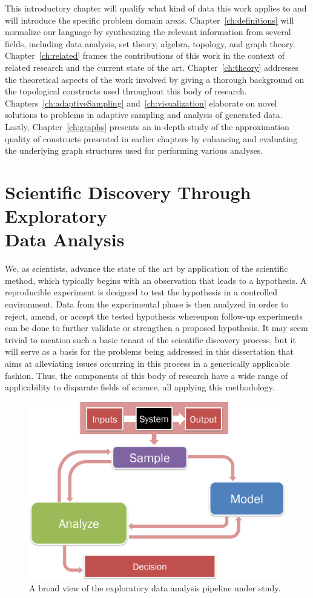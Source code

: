 This introductory chapter will qualify what kind of data this work applies to and will introduce the specific problem domain areas.
%
Chapter~\ref{ch:definitions} will normalize our language by synthesizing the relevant information from several fields, including data analysis, set theory, algebra, topology, and graph theory.
%
Chapter~\ref{ch:related} frames the contributions of this work in the context of related research and the current state of the art.
%
Chapter~\ref{ch:theory} addresses the theoretical aspects of the work involved by giving a thorough background on the topological constructs used throughout this body of research.
%
Chapters~\ref{ch:adaptiveSampling} and~\ref{ch:visualization} elaborate on novel solutions to problems in adaptive sampling and analysis of generated data.
%
Lastly, Chapter~\ref{ch:graphs} presents an in-depth study of the approximation quality of constructs presented in earlier chapters by enhancing and evaluating the underlying graph structures used for performing various analyses.

\section{Scientific Discovery Through Exploratory\\Data Analysis}

We, as scientists, advance the state of the art by application of the scientific method, which typically begins with an observation that leads to a hypothesis.
%
A reproducible experiment is designed to test the hypothesis in a controlled environment.
%
Data from the experimental phase is then analyzed in order to reject, amend, or accept the tested hypothesis whereupon follow-up experiments can be done to further validate or strengthen a proposed hypothesis.
%
It may seem trivial to mention such a basic tenant of the scientific discovery process, but it will serve as a basis for the problems being addressed in this dissertation that aims at alleviating issues occurring in this process in a generically applicable fashion.
%
Thus, the components of this body of research have a wide range of applicability to disparate fields of science, all applying this methodology.

\begin{figure}[t]
  \centering
  \includegraphics[width=.65\textwidth]{figs/chap1/pipeline}
  \caption[Data collection cycle for scientific discovery]{A broad view of the exploratory data analysis pipeline under study.}
  \label{fig:dataCycle}
\end{figure}

